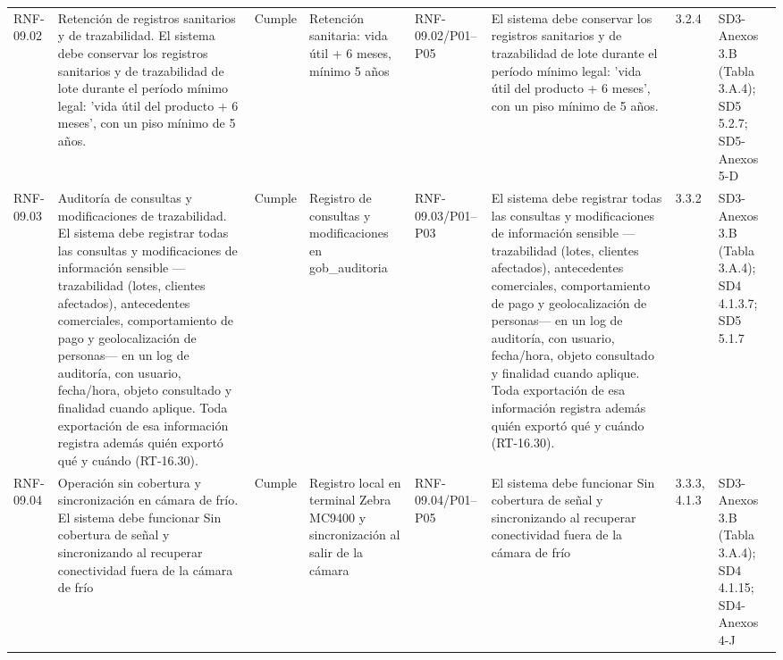\documentclass[oficio,firma,final]{lafrox}
\begin{document}
\begin{landscape}
{\begin{longtable}{@{}F{0.054} F{0.173} F{0.061} F{0.191} F{0.106} F{0.180} F{0.067} F{0.168}@{}}
  RNF-09.02 & Retención de registros sanitarios y de trazabilidad. El sistema debe conservar los registros sanitarios y de trazabilidad de lote durante el período mínimo legal: 'vida útil del producto + 6 meses', con un piso mínimo de 5 años. & Cumple & Retención sanitaria: vida útil + 6 meses, mínimo 5 años & RNF-09.02/\allowbreak{}P01--\allowbreak{}P05 & El sistema debe conservar los registros sanitarios y de trazabilidad de lote durante el período mínimo legal: 'vida útil del producto + 6 meses', con un piso mínimo de 5 años. & 3.2.4 & SD3-Anexos 3.B (Tabla 3.A.4); SD5 5.2.7; SD5-Anexos 5-D  \\
  RNF-09.03 & Auditoría de consultas y modificaciones de trazabilidad. El sistema debe registrar todas las consultas y modificaciones de información sensible —trazabilidad (lotes, clientes afectados), antecedentes comerciales, comportamiento de pago y geolocalización de personas— en un log de auditoría, con usuario, fecha/hora, objeto consultado y finalidad cuando aplique. Toda exportación de esa información registra además quién exportó qué y cuándo (RT-16.30). & Cumple & Registro de consultas y modificaciones en gob\_auditoria & RNF-09.03/\allowbreak{}P01--\allowbreak{}P03 & El sistema debe registrar todas las consultas y modificaciones de información sensible —trazabilidad (lotes, clientes afectados), antecedentes comerciales, comportamiento de pago y geolocalización de personas— en un log de auditoría, con usuario, fecha/hora, objeto consultado y finalidad cuando aplique. Toda exportación de esa información registra además quién exportó qué y cuándo (RT-16.30). & 3.3.2 & SD3-Anexos 3.B (Tabla 3.A.4); SD4 4.1.3.7; SD5 5.1.7  \\
  RNF-09.04 & Operación sin cobertura y sincronización en cámara de frío. El sistema debe funcionar Sin cobertura de señal y sincronizando al recuperar conectividad fuera de la cámara de frío & Cumple & Registro local en terminal Zebra MC9400 y sincronización al salir de la cámara & RNF-09.04/\allowbreak{}P01--\allowbreak{}P05 & El sistema debe funcionar Sin cobertura de señal y sincronizando al recuperar conectividad fuera de la cámara de frío & 3.3.3, 4.1.3 & SD3-Anexos 3.B (Tabla 3.A.4); SD4 4.1.15; SD4-Anexos 4-J  \\

\end{longtable}}
\end{landscape}
\end{document}
